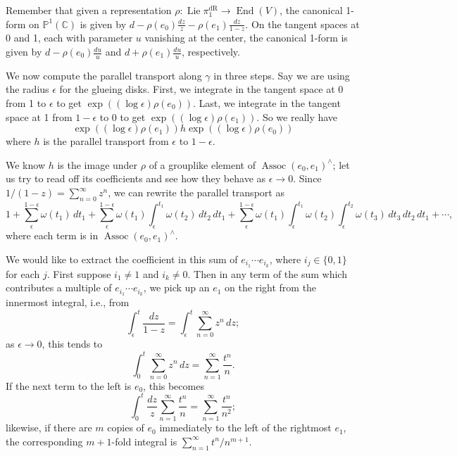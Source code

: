 \documentclass[12pt]{article}
\def\CC{\mathbb{C}}
\def\PP{\mathbb{P}}
\DeclareMathOperator{\Assoc}{Assoc}
\DeclareMathOperator{\dR}{dR}
\DeclareMathOperator{\End}{End}
\DeclareMathOperator{\Lie}{Lie}
\begin{document}
Remember that given a representation $\rho: \Lie \pi_1^{\dR} \to
\End(V)$, the canonical 1-form on $\PP^1(\CC)$ is given by 
$d - \rho(e_0) \frac{dz}{z} - \rho(e_1) \frac{dz}{1-z}$.
On the tangent spaces at 0 and 1, each with parameter $u$ vanishing at
the center, the canonical 1-form is given by
$d - \rho(e_0) \frac{du}{u}$ and $d + \rho(e_1) \frac{du}{u}$,
respectively.

We now compute the parallel transport along $\gamma$ in three steps.
Say we are using the radius $\epsilon$ for the glueing disks.
First, we integrate in the tangent space at 0 from 1 to $\epsilon$
to get $\exp((\log \epsilon) \rho(e_0))$. Last, we integrate in the tangent
space at 1 from $1-\epsilon$ to 0 to get $\exp((\log \epsilon) \rho(e_1))$.
So we really have
\[
\exp((\log \epsilon) \rho(e_1)) h \exp((\log \epsilon) \rho(e_0))
\]
where $h$ is the parallel transport from $\epsilon$ to $1-\epsilon$.

We know $h$ is the image under $\rho$ of a
grouplike element of $\Assoc(e_0, e_1)^\wedge$;
let us try to read off its coefficients and see how they behave as
$\epsilon \to 0$. Since $1/(1-z) = \sum_{n=0}^\infty
z^n$, we can rewrite the parallel transport as
\[
1 + \sum_{\epsilon}^{1-\epsilon} \omega(t_1)\,dt_1 + \sum_\epsilon^{1-\epsilon}
\omega(t_1) \int_{\epsilon}^{t_1} \omega(t_2) \,dt_2\,dt_1 + 
\sum_\epsilon^{1-\epsilon} \omega(t_1) \int_{\epsilon}^{t_1}
\omega(t_2) \int_{\epsilon}^{t_2} \omega(t_3)\,dt_3\,dt_2\,dt_1 + \cdots,
\]
where each term is in $\Assoc(e_0, e_1)^\wedge$.

We would like to extract the coefficient in this sum of $e_{i_1} \cdots
e_{i_k}$, where $i_j \in \{0,1\}$ for each $j$. First suppose
$i_1 \neq 1$ and $i_k \neq 0$. Then in any term of the sum which contributes
a multiple of $e_{i_1}\cdots e_{i_k}$, we pick up an $e_1$ on the right
from the innermost integral, i.e., from
\[
\int_\epsilon^t \frac{dz}{1-z} = \int_\epsilon^t \sum_{n=0}^\infty z^n\,dz;
\]
as $\epsilon \to 0$, this tends to
\[
\int_0^t \sum_{n=0}^\infty z^n\,dz = \sum_{n=1}^\infty \frac{t^n}{n}.
\]
If the next term to the left is $e_0$, this becomes
\[
\int_0^t \frac{dz}{z} \sum_{n=1}^\infty \frac{t^n}{n} = \sum_{n=1}^\infty
\frac{t^n}{n^2};
\]
likewise, if there are $m$ copies of $e_0$ immediately to the left of
the rightmost $e_1$, the corresponding $m+1$-fold integral is
$\sum_{n=1}^\infty t^n/n^{m+1}$.
\end{document}
